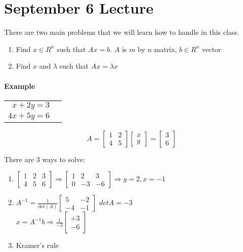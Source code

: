 \section{September 6 Lecture}

There are two main problems that we will learn how to handle in this class.

\begin{enumerate}
	\item Find $x \in R^n$ such that $Ax=b$. $A$ is $m$ by $n$ matrix, $b \in R^n$ vector
	\item Find $x$ and $\lambda$ such that $Ax = \lambda x$
\end{enumerate}

\paragraph{Example}

\begin{tabular}{rr}
	$x + 2y = 3$ \\
	$4x + 5y = 6$
\end{tabular}

$$ A =
\begin{bmatrix}
	1 & 2 \\
	4 & 5 
\end{bmatrix}
\begin{bmatrix}
	x \\ y
\end{bmatrix}
=
\begin{bmatrix}
	3 \\ 6
\end{bmatrix}
$$

There are 3 ways to solve:
\begin{enumerate}
	\item $\begin{bmatrix}
		1 & 2 & 3 \\
		4 & 5 & 6
	\end{bmatrix} \Rightarrow
	\begin{bmatrix}
		1 & 2 & 3 \\
		0 & -3 & -6
	\end{bmatrix}\Rightarrow
	y=2,x=-1$ 
	\item $A^{-1}=\frac{1}{\text{det}(A)}
	\begin{bmatrix}
		5 & -2 \\
		-4 & -1 
	\end{bmatrix}$
	$det A = -3$ \\
	$x=A^{-1}b \Rightarrow \frac{1}{-3}
	\begin{bmatrix}
		+3 \\ -6
	\end{bmatrix}$
	\item Kramer's rule
\end{enumerate}

